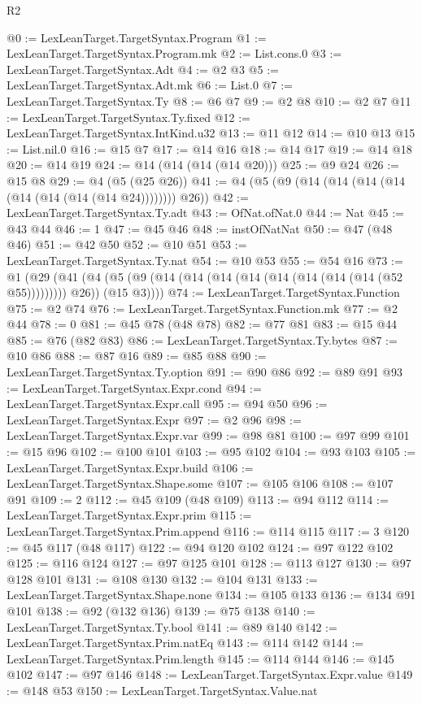 \begin{lexlean}{R2}
\begin{coremodule}
@0 := LexLeanTarget.TargetSyntax.Program
@1 := LexLeanTarget.TargetSyntax.Program.mk
@2 := List.cons.{0}
@3 := LexLeanTarget.TargetSyntax.Adt
@4 := @2 @3
@5 := LexLeanTarget.TargetSyntax.Adt.mk
@6 := List.{0}
@7 := LexLeanTarget.TargetSyntax.Ty
@8 := @6 @7
@9 := @2 @8
@10 := @2 @7
@11 := LexLeanTarget.TargetSyntax.Ty.fixed
@12 := LexLeanTarget.TargetSyntax.IntKind.u32
@13 := @11 @12
@14 := @10 @13
@15 := List.nil.{0}
@16 := @15 @7
@17 := @14 @16
@18 := @14 @17
@19 := @14 @18
@20 := @14 @19
@24 := @14 (@14 (@14 (@14 @20)))
@25 := @9 @24
@26 := @15 @8
@29 := @4 (@5 (@25 @26))
@41 := @4 (@5 (@9 (@14 (@14 (@14 (@14 (@14 (@14 (@14 (@14 @24)))))))) @26))
@42 := LexLeanTarget.TargetSyntax.Ty.adt
@43 := OfNat.ofNat.{0}
@44 := Nat
@45 := @43 @44
@46 := 1
@47 := @45 @46
@48 := instOfNatNat
@50 := @47 (@48 @46)
@51 := @42 @50
@52 := @10 @51
@53 := LexLeanTarget.TargetSyntax.Ty.nat
@54 := @10 @53
@55 := @54 @16
@73 := @1
    (@29
      (@41 (@4 (@5 (@9 (@14 (@14 (@14 (@14 (@14 (@14 (@14 (@14 (@52 @55))))))))) @26)) (@15 @3))))
@74 := LexLeanTarget.TargetSyntax.Function
@75 := @2 @74
@76 := LexLeanTarget.TargetSyntax.Function.mk
@77 := @2 @44
@78 := 0
@81 := @45 @78 (@48 @78)
@82 := @77 @81
@83 := @15 @44
@85 := @76 (@82 @83)
@86 := LexLeanTarget.TargetSyntax.Ty.bytes
@87 := @10 @86
@88 := @87 @16
@89 := @85 @88
@90 := LexLeanTarget.TargetSyntax.Ty.option
@91 := @90 @86
@92 := @89 @91
@93 := LexLeanTarget.TargetSyntax.Expr.cond
@94 := LexLeanTarget.TargetSyntax.Expr.call
@95 := @94 @50
@96 := LexLeanTarget.TargetSyntax.Expr
@97 := @2 @96
@98 := LexLeanTarget.TargetSyntax.Expr.var
@99 := @98 @81
@100 := @97 @99
@101 := @15 @96
@102 := @100 @101
@103 := @95 @102
@104 := @93 @103
@105 := LexLeanTarget.TargetSyntax.Expr.build
@106 := LexLeanTarget.TargetSyntax.Shape.some
@107 := @105 @106
@108 := @107 @91
@109 := 2
@112 := @45 @109 (@48 @109)
@113 := @94 @112
@114 := LexLeanTarget.TargetSyntax.Expr.prim
@115 := LexLeanTarget.TargetSyntax.Prim.append
@116 := @114 @115
@117 := 3
@120 := @45 @117 (@48 @117)
@122 := @94 @120 @102
@124 := @97 @122 @102
@125 := @116 @124
@127 := @97 @125 @101
@128 := @113 @127
@130 := @97 @128 @101
@131 := @108 @130
@132 := @104 @131
@133 := LexLeanTarget.TargetSyntax.Shape.none
@134 := @105 @133
@136 := @134 @91 @101
@138 := @92 (@132 @136)
@139 := @75 @138
@140 := LexLeanTarget.TargetSyntax.Ty.bool
@141 := @89 @140
@142 := LexLeanTarget.TargetSyntax.Prim.natEq
@143 := @114 @142
@144 := LexLeanTarget.TargetSyntax.Prim.length
@145 := @114 @144
@146 := @145 @102
@147 := @97 @146
@148 := LexLeanTarget.TargetSyntax.Expr.value
@149 := @148 @53
@150 := LexLeanTarget.TargetSyntax.Value.nat

\end{coremodule}
\end{lexlean}
